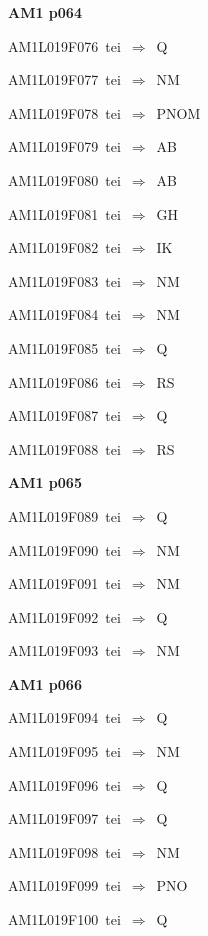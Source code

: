 \par\vfill\eject
{\bf\hfill AM1 p064\hfill\hbox{}}\par\bigskip
{\sixrm AM1L019F076\ {\sixit tei}\ }$\Rightarrow$\ Q\par\smallskip
{\sixrm AM1L019F077\ {\sixit tei}\ }$\Rightarrow$\ NM\par\smallskip
{\sixrm AM1L019F078\ {\sixit tei}\ }$\Rightarrow$\ PNOM\par\smallskip
{\sixrm AM1L019F079\ {\sixit tei}\ }$\Rightarrow$\ AB\par\smallskip
{\sixrm AM1L019F080\ {\sixit tei}\ }$\Rightarrow$\ AB\par\smallskip
{\sixrm AM1L019F081\ {\sixit tei}\ }$\Rightarrow$\ GH\par\smallskip
{\sixrm AM1L019F082\ {\sixit tei}\ }$\Rightarrow$\ IK\par\smallskip
{\sixrm AM1L019F083\ {\sixit tei}\ }$\Rightarrow$\ NM\par\smallskip
{\sixrm AM1L019F084\ {\sixit tei}\ }$\Rightarrow$\ NM\par\smallskip
{\sixrm AM1L019F085\ {\sixit tei}\ }$\Rightarrow$\ Q\par\smallskip
{\sixrm AM1L019F086\ {\sixit tei}\ }$\Rightarrow$\ RS\par\smallskip
{\sixrm AM1L019F087\ {\sixit tei}\ }$\Rightarrow$\ Q\par\smallskip
{\sixrm AM1L019F088\ {\sixit tei}\ }$\Rightarrow$\ RS\par\smallskip

\par\vfill\eject
{\bf\hfill AM1 p065\hfill\hbox{}}\par\bigskip
{\sixrm AM1L019F089\ {\sixit tei}\ }$\Rightarrow$\ Q\par\smallskip
{\sixrm AM1L019F090\ {\sixit tei}\ }$\Rightarrow$\ NM\par\smallskip
{\sixrm AM1L019F091\ {\sixit tei}\ }$\Rightarrow$\ NM\par\smallskip
{\sixrm AM1L019F092\ {\sixit tei}\ }$\Rightarrow$\ Q\par\smallskip
{\sixrm AM1L019F093\ {\sixit tei}\ }$\Rightarrow$\ NM\par\smallskip

\par\vfill\eject
{\bf\hfill AM1 p066\hfill\hbox{}}\par\bigskip
{\sixrm AM1L019F094\ {\sixit tei}\ }$\Rightarrow$\ Q\par\smallskip
{\sixrm AM1L019F095\ {\sixit tei}\ }$\Rightarrow$\ NM\par\smallskip
{\sixrm AM1L019F096\ {\sixit tei}\ }$\Rightarrow$\ Q\par\smallskip
{\sixrm AM1L019F097\ {\sixit tei}\ }$\Rightarrow$\ Q\par\smallskip
{\sixrm AM1L019F098\ {\sixit tei}\ }$\Rightarrow$\ NM\par\smallskip
{\sixrm AM1L019F099\ {\sixit tei}\ }$\Rightarrow$\ PNO\par\smallskip
{\sixrm AM1L019F100\ {\sixit tei}\ }$\Rightarrow$\ Q\par\smallskip

